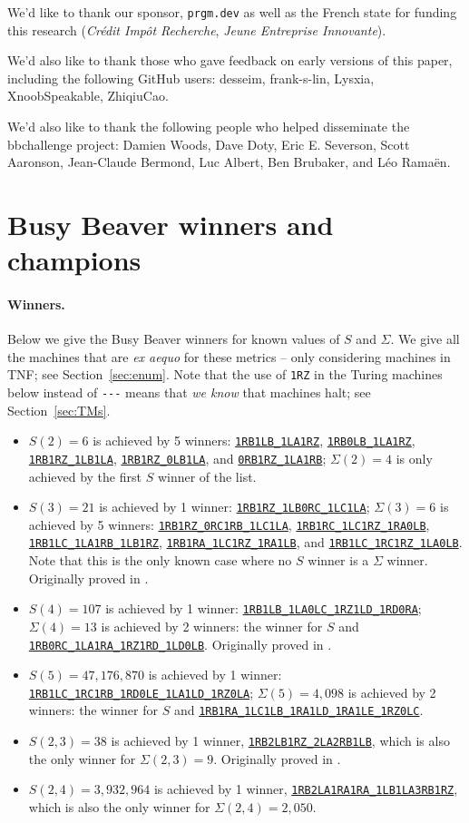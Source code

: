 \documentclass[a4paper,british]{article}
\theoremstyle{definition} %
\numberwithin{equation}{section}
\theoremstyle{definition} %
\newcommand{\tm}[1]{\href{https://bbchallenge.org/#1}{\texttt{\nolinkurl{#1}}}}
\newcommand{\BBtheFifth}{47{,}176{,}870}
\newcommand{\BBTxF}{3{,}932{,}964}
\begin{document}
We'd like to thank our sponsor, \texttt{prgm.dev} as well as the French state for funding this research (\textit{Crédit Impôt Recherche}, \textit{Jeune Entreprise Innovante}).

We'd also like to thank those who gave feedback on early versions of this paper, including the following GitHub users: desseim, frank-s-lin, Lysxia, XnoobSpeakable, ZhiqiuCao.

We'd also like to thank the following people who helped disseminate the bbchallenge project: Damien Woods, Dave Doty, Eric E. Severson, Scott Aaronson, Jean-Claude Bermond, Luc Albert, Ben Brubaker, and Léo Ramaën.

\newpage

\vspace*{-5em}
\section{Busy Beaver winners and champions}\label{app:lowerbounds}

\paragraph{Winners.} Below we give the Busy Beaver winners for known values of $S$ and $\Sigma$. We give all the machines that are \textit{ex aequo} for these metrics -- only considering machines in TNF; see Section~\ref{sec:enum}. Note that the use of \texttt{1RZ} in the Turing machines below instead of \verb|---| means that \textit{we know} that machines halt; see Section~\ref{sec:TMs}.
\begin{itemize}
    \item $S(2) = 6$ is achieved by 5 winners: \tm{1RB1LB_1LA1RZ}, \tm{1RB0LB_1LA1RZ}, \tm{1RB1RZ_1LB1LA}, \tm{1RB1RZ_0LB1LA}, and \tm{0RB1RZ_1LA1RB}; $\Sigma(2) = 4$ is only achieved by the first $S$ winner of the list.
    \item $S(3) = 21$ is achieved by 1 winner: \tm{1RB1RZ_1LB0RC_1LC1LA}; $\Sigma(3) = 6$ is achieved by 5 winners: \tm{1RB1RZ_0RC1RB_1LC1LA}, \tm{1RB1RC_1LC1RZ_1RA0LB}, \tm{1RB1LC_1LA1RB_1LB1RZ}, \tm{1RB1RA_1LC1RZ_1RA1LB}, and \tm{1RB1LC_1RC1RZ_1LA0LB}. Note that this is the only known case where no $S$ winner is a $\Sigma$ winner. Originally proved in \cite{Lin1963}.
    \item $S(4) = 107$ is achieved by 1 winner: \tm{1RB1LB_1LA0LC_1RZ1LD_1RD0RA}; $\Sigma(4) = 13$ is achieved by 2 winners: the winner for $S$ and \tm{1RB0RC_1LA1RA_1RZ1RD_1LD0LB}. Originally proved in \cite{Brady83}.
    \item $S(5) = \BBtheFifth$ is achieved by 1 winner: \tm{1RB1LC_1RC1RB_1RD0LE_1LA1LD_1RZ0LA}; $\Sigma(5) = 4{,}098$ is achieved by 2 winners: the winner for $S$ and \tm{1RB1RA_1LC1LB_1RA1LD_1RA1LE_1RZ0LC}.
    \item $S(2,3) = 38$ is achieved by 1 winner, \tm{1RB2LB1RZ_2LA2RB1LB}, which is also the only winner for $\Sigma(2,3) = 9$. Originally proved in \cite{LafittePapazian2007}.
    \item $S(2,4) = \BBTxF$ is achieved by 1 winner, \tm{1RB2LA1RA1RA_1LB1LA3RB1RZ}, which is also the only winner for $\Sigma(2,4)=2{,}050$.
\end{itemize}
\end{document}
